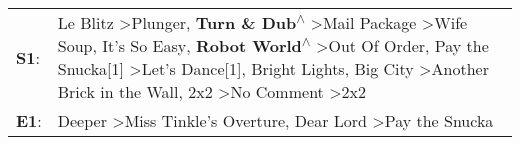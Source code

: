 \begin{supertabular}{p{0.03\textwidth}p{0.92\textwidth}}
 \textbf{S1}:  &  Le Blitz\textsuperscript{} \textgreater \enspace Plunger\textsuperscript{}, \enspace \textbf{Turn \& Dub\textsuperscript{$\wedge$}} \textgreater \enspace Mail Package\textsuperscript{} \textgreater \enspace Wife Soup\textsuperscript{}, \enspace It's So Easy\textsuperscript{}, \enspace \textbf{Robot World\textsuperscript{$\wedge$}} \textgreater \enspace Out Of Order\textsuperscript{}, \enspace Pay the Snucka[1]\textsuperscript{} \textgreater \enspace Let's Dance[1]\textsuperscript{}, \enspace Bright Lights, Big City\textsuperscript{} \textgreater \enspace Another Brick in the Wall\textsuperscript{}, \enspace 2x2\textsuperscript{} \textgreater \enspace No Comment\textsuperscript{} \textgreater \enspace 2x2\textsuperscript{}  \enspace  \\
 \textbf{E1}:  &                                                                                                                                                                                                                                                                                                                                                                                                                                                                                                                                                                         Deeper\textsuperscript{} \textgreater \enspace Miss Tinkle's Overture\textsuperscript{}, \enspace Dear Lord\textsuperscript{} \textgreater \enspace Pay the Snucka\textsuperscript{}  \enspace  \\
\end{supertabular}
